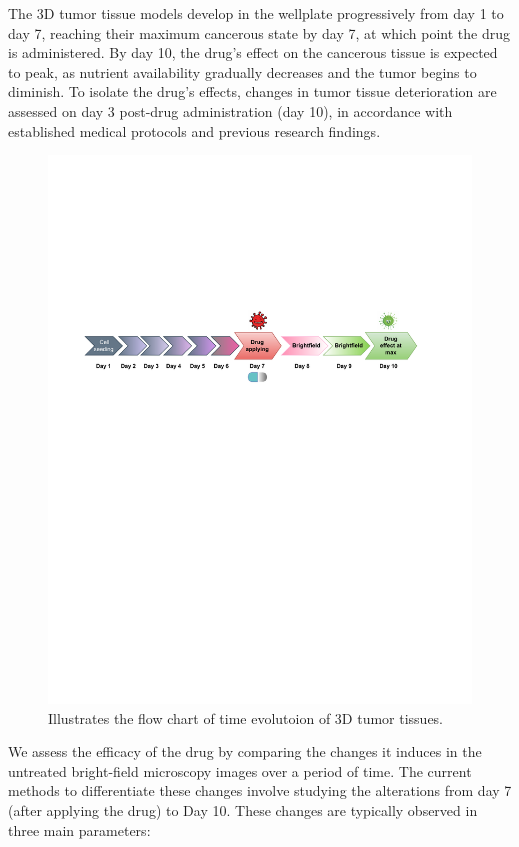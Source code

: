 \documentclass[12pt,twoside,a4paper,parskip]{scrbook} %
\begin{document}
The 3D tumor tissue models develop in the wellplate progressively from day 1 to day 7, reaching their maximum cancerous state by day 7, at which point the drug is administered. By day 10, the drug's effect on the cancerous tissue is expected to peak, as nutrient availability gradually decreases and the tumor begins to diminish. To isolate the drug's effects, changes in tumor tissue deterioration are assessed on day 3 post-drug administration (day 10),  in accordance with established medical protocols and previous research findings.
\begin{figure}[H]
  \centering
  \includegraphics[scale=0.9]{figures/timed.pdf} 
  \caption{Illustrates the flow chart of time evolutoion of 3D tumor tissues.}
  \label{fig:time}
\end{figure}

We assess the efficacy of the drug by comparing the changes it induces in the untreated bright-field microscopy images over a period of time. The current methods to differentiate these changes involve studying the alterations from day 7 (after applying the drug) to Day 10. These changes are typically observed in three main parameters: 
\end{document}
